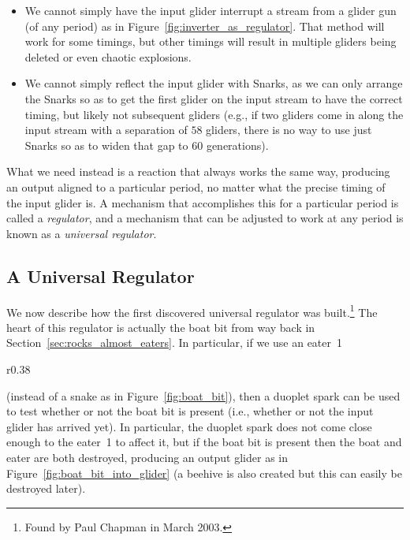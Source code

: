 \begin{itemize}
	\item We cannot simply have the input glider interrupt a stream from a glider gun (of any period) as in Figure~\ref{fig:inverter_as_regulator}. That method will work for some timings, but other timings will result in multiple gliders being deleted or even chaotic explosions.\smallskip
	
	\item We cannot simply reflect the input glider with Snarks, as we can only arrange the Snarks so as to get the first glider on the input stream to have the correct timing, but likely not subsequent gliders (e.g., if two gliders come in along the input stream with a separation of $58$ gliders, there is no way to use just Snarks so as to widen that gap to $60$ generations).\smallskip
\end{itemize}

What we need instead is a reaction that always works the same way, producing an output aligned to a particular period, no matter what the precise timing of the input glider is. A mechanism that accomplishes this for a particular period is called a \emph{regulator}, and a mechanism that can be adjusted to work at any period is known as a \emph{universal regulator}.


\subsection{A Universal Regulator}\label{sec:chapman_universal_regulator}

We now describe how the first discovered universal regulator was built.\footnote{Found by Paul Chapman in March 2003.} The heart of this regulator is actually the boat bit from way back in Section~\ref{sec:rocks_almost_eaters}. In particular, if we use an eater~1
\begin{wrapfigure}{r}{0.38\textwidth}
	\centering
	\caption{A duoplet spark turning a boat bit into a glider and beehive. If the boat is not present, nothing happens.}\label{fig:boat_bit_into_glider}
\end{wrapfigure}
(instead of a snake as in Figure~\ref{fig:boat_bit}), then a duoplet spark can be used to test whether or not the boat bit is present (i.e., whether or not the input glider has arrived yet). In particular, the duoplet spark does not come close enough to the eater~1 to affect it, but if the boat bit is present then the boat and eater are both destroyed, producing an output glider as in Figure~\ref{fig:boat_bit_into_glider} (a beehive is also created but this can easily be destroyed later).

